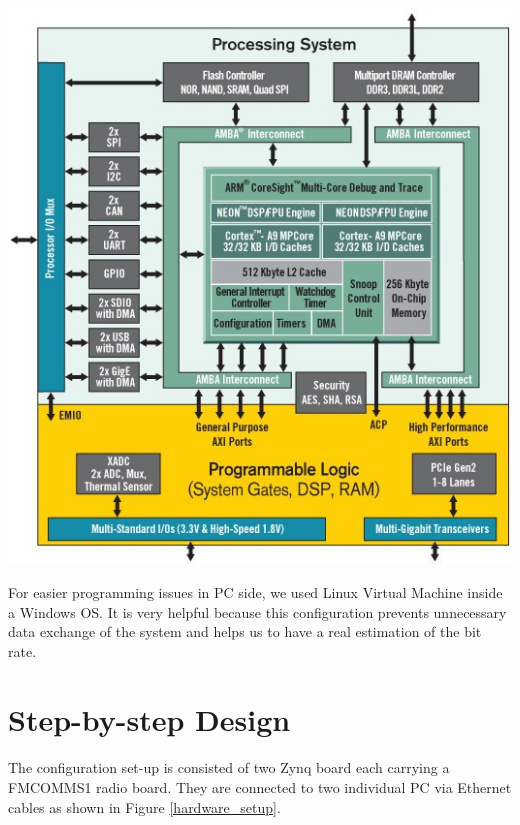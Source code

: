 \begin{center}
\includegraphics[width=\textwidth]{content/fig/zynq_inside.JPG}
\label{design_block_diagram}
\end{center}

For easier programming issues in PC side, we used Linux Virtual Machine inside a Windows OS. It is very helpful because this configuration prevents unnecessary data exchange of the system and helps us to have a real estimation of the bit rate.\\

\section{Step-by-step Design}
The configuration set-up is consisted of two Zynq board each carrying a FMCOMMS1 radio board. They are connected to two individual PC via Ethernet cables as shown in Figure \ref{hardware_setup}.\\

